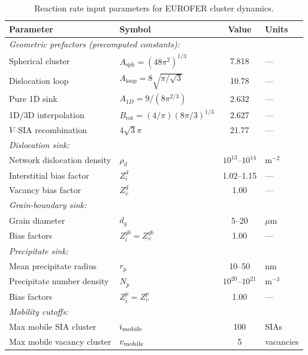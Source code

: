\documentclass[pdflatex,sn-basic]{sn-jnl} %
\begin{document}
\begin{table}[htbp]
\centering
\caption{Reaction rate input parameters for EUROFER cluster dynamics.}
\label{tab:rate_params}
\renewcommand{\arraystretch}{1.15}
\begin{tabular}{@{}llcl@{}}
\toprule
\textbf{Parameter} & \textbf{Symbol} & \textbf{Value} & \textbf{Units} \\
\midrule
\multicolumn{4}{l}{\emph{Geometric prefactors (precomputed constants):}} \\
Spherical cluster & $A_{\mathrm{sph}} = (48\pi^2)^{1/3}$ & 7.818 & --- \\
Dislocation loop & $A_{\mathrm{loop}} = 8\sqrt{\pi/\sqrt{3}}$ & 10.78 & --- \\
Pure 1D sink & $A_{1D} = 9/(8\pi^{2/3})$ & 2.632 & --- \\
1D/3D interpolation & $B_{\mathrm{rot}} = (4/\pi)(8\pi/3)^{1/3}$ & 2.627 & --- \\
$V$--SIA recombination & $4\sqrt{3}\pi$ & 21.77 & --- \\[4pt]

\multicolumn{4}{l}{\emph{Dislocation sink:}} \\
Network dislocation density & $\rho_d$ & $10^{13}$--$10^{14}$ & m$^{-2}$ \\
Interstitial bias factor & $Z_i^d$ & 1.02--1.15 & --- \\
Vacancy bias factor & $Z_v^d$ & 1.00 & --- \\[4pt]

\multicolumn{4}{l}{\emph{Grain-boundary sink:}} \\
Grain diameter & $d_g$ & 5--20 & $\mu$m \\
Bias factors & $Z_i^{gb} = Z_v^{gb}$ & 1.00 & --- \\[4pt]

\multicolumn{4}{l}{\emph{Precipitate sink:}} \\
Mean precipitate radius & $r_p$ & 10--50 & nm \\
Precipitate number density & $N_p$ & $10^{20}$--$10^{21}$ & m$^{-3}$ \\
Bias factors & $Z_i^p = Z_v^p$ & 1.00 & --- \\[4pt]

\multicolumn{4}{l}{\emph{Mobility cutoffs:}} \\
Max mobile SIA cluster & $i_{\rm mobile}$ & 100 & SIAs \\
Max mobile vacancy cluster & $v_{\rm mobile}$ & 5 & vacancies \\[4pt]


\end{tabular}
\end{table}
\end{document}
